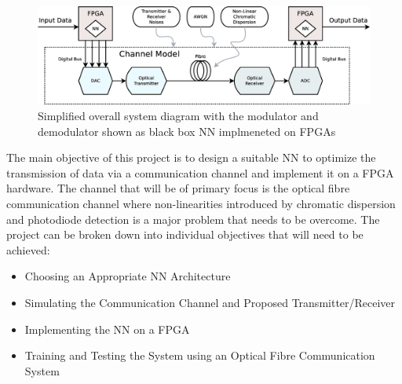 \begin{figure}[H]
	\centering
	\includegraphics[width=\linewidth]{graphics/overall_diagram2.eps}
	\caption{Simplified overall system diagram with the modulator and demodulator shown as black box NN implmeneted on FPGAs}
	\label{fig:overall}	
\end{figure}

The main objective of this project is to design a suitable NN to optimize the transmission of data via a communication channel and implement it on a FPGA hardware. The channel that will be of primary focus is the optical fibre communication channel where non-linearities introduced by chromatic dispersion and photodiode detection is a major problem that needs to be overcome. The project can be broken down into individual objectives that will need to be achieved:

\begin{itemize}
    \item Choosing an Appropriate NN Architecture
    \item Simulating the Communication Channel and Proposed Transmitter/Receiver
    \item Implementing the NN on a FPGA
    \item Training and Testing the System using an Optical Fibre Communication System
\end{itemize}


